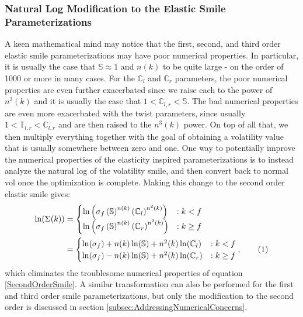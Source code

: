 \documentclass[12pt, a4paper, notitlepage]{article}
\numberwithin{equation}{subsection}
\numberwithin{figure}{subsection}
\numberwithin{table}{subsection}
\newcommand\numberthis{\addtocounter{equation}{1}\tag{\theequation}}
\newcommand{\newpar}{\newline \newline}
\begin{document}
\subsubsection{Natural Log Modification to the Elastic Smile Parameterizations}
\label{subsec:NatLogElasticMod}
A keen mathematical mind may notice that the first, second, and third order elastic smile parameterizations may have poor numerical properties.  In particular, it is usually the case that $\mathbb{S} \approx 1$ and $n(k)$ to be quite large - on the order of 1000 or more in many cases.  For the $\mathbb{C}_l$ and $\mathbb{C}_r$ parameters, the poor numerical properties are even further exacerbated since we raise each to the power of $n^{2}(k)$ and it is usually the case that $1 < \mathbb{C}_{l,r} < \mathbb{S}$.  The bad numerical properties are even more exacerbated with the twist parameters, since usually $1 < \mathbb{T}_{l,r} < \mathbb{C}_{l,r}$ and are then raised to the $n^{3}(k)$ power.  On top of all that, we then multiply everything together with the goal of obtaining a volatility value that is usually somewhere between zero and one.
\newpar
One way to potentially improve the numerical properties of the elasticity inspired parameterizations is to instead analyze the natural log of the volatility smile, and then convert back to normal vol once the optimization is complete.  Making this change to the second order elastic smile gives:
\begin{align*}
\ln(\Sigma(k)) 
&= 		\begin{cases}
			\ln\left(\sigma_f\left(\mathbb{S}\right)^{n(k)}\left(\mathbb{C}_l\right)^{n^{2}(k)}\right) & : k < f	\\
            \ln\left(\sigma_f\left(\mathbb{S}\right)^{n(k)}\left(\mathbb{C}_r\right)^{n^{2}(k)}\right) & : k \geq f	\\
        \end{cases} \\
&=		\begin{cases}
			\ln(\sigma_f) + n(k)\ln(\mathbb{S}) + n^{2}(k)\ln(\mathbb{C}_l) & : k < f	\\	
            \ln(\sigma_f) - n(k)\ln(\mathbb{S}) + n^{2}(k)\ln(\mathbb{C}_r) & : k \geq f	\\
        \end{cases}, \numberthis
\end{align*}
\label{SecondOrderSmileNaturalLog}
\newline
which eliminates the troublesome numerical properties of equation \ref{SecondOrderSmile}.  A similar transformation can also be performed for the first and third order smile parameterizations, but only the modification to the second order is discussed in section \ref{subsec:AddressingNumericalConcerns}.
\end{document}
